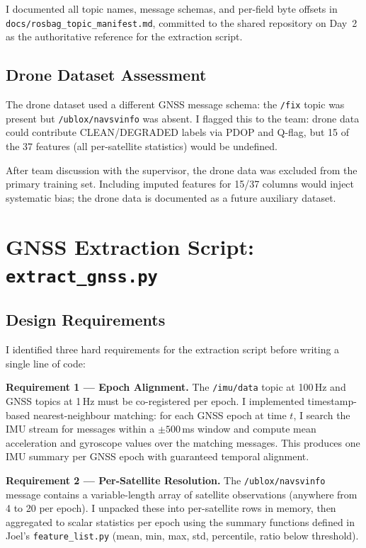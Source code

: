 \documentclass[12pt,a4paper]{article}
\newcommand{\code}[1]{\texttt{#1}}
\begin{document}
I documented all topic names, message schemas, and per-field byte offsets in
\code{docs/rosbag\_topic\_manifest.md}, committed to the shared repository on Day~2 as
the authoritative reference for the extraction script.

\subsection{Drone Dataset Assessment}

The drone dataset used a different GNSS message schema: the \code{/fix} topic was present
but \code{/ublox/navsvinfo} was absent.
I flagged this to the team: drone data could contribute CLEAN/DEGRADED labels via PDOP
and Q-flag, but 15 of the 37 features (all per-satellite statistics) would be undefined.

After team discussion with the supervisor, the drone data was excluded from the primary
training set.
Including imputed features for 15/37 columns would inject systematic bias; the drone data
is documented as a future auxiliary dataset.

\section{GNSS Extraction Script: \texttt{extract\_gnss.py}}

\subsection{Design Requirements}

I identified three hard requirements for the extraction script before writing a single
line of code:

\textbf{Requirement 1 --- Epoch Alignment.}
The \code{/imu/data} topic at 100\,Hz and GNSS topics at 1\,Hz must be co-registered
per epoch.
I implemented timestamp-based nearest-neighbour matching: for each GNSS epoch at time
$t$, I search the IMU stream for messages within a $\pm 500$\,ms window and compute
mean acceleration and gyroscope values over the matching messages.
This produces one IMU summary per GNSS epoch with guaranteed temporal alignment.

\textbf{Requirement 2 --- Per-Satellite Resolution.}
The \code{/ublox/navsvinfo} message contains a variable-length array of satellite
observations (anywhere from 4 to 20 per epoch).
I unpacked these into per-satellite rows in memory, then aggregated to scalar statistics
per epoch using the summary functions defined in Joel's \code{feature\_list.py} (mean,
min, max, std, percentile, ratio below threshold).
\end{document}
